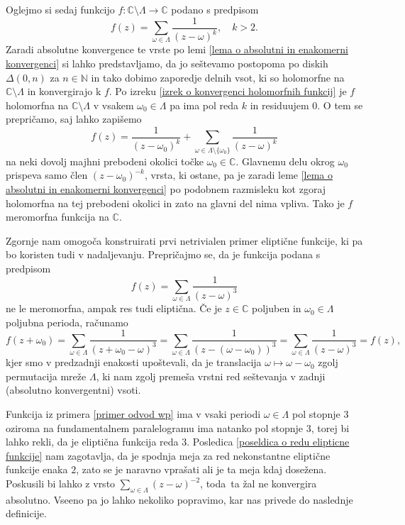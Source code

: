 \documentclass[mat1]{fmfdelo}
\newcommand{\N}{\mathbb N}
\newcommand{\C}{\mathbb C}
\newcommand{\om}{\omega}
\newcommand{\disk}[2]{\Delta(#1, #2)}
\theoremstyle{definition}
\begin{document}
\begin{dokaz}
    \cite[\S 5, Theorem 1]{Ahlfors}
\end{dokaz}
    
Oglejmo si sedaj funkcijo $f:\C\setminus\Lambda \to \C$ podano s predpisom
\[
    f(z) = \sum_{\om \in \Lambda} \frac{1}{(z - \om)^k}, \quad k > 2.
\]
Zaradi absolutne konvergence te vrste po lemi \ref{lema o absolutni in enakomerni konvergenci} si lahko predstavljamo, da jo seštevamo postopoma po diskih $\disk{0}{n}$ za $n\in\N$ in tako dobimo zaporedje delnih vsot, ki so holomorfne na $\C\setminus\Lambda$ in konvergirajo k $f$. Po izreku \ref{izrek o konvergenci holomorfnih funkcij} je $f$ holomorfna na $\C \setminus \Lambda$ v vsakem $\om_0 \in \Lambda$ pa ima pol reda $k$ in residuujem $0$. O tem se prepričamo, saj lahko zapišemo
\[
    f(z) = \frac{1}{(z-\om_0)^k} + \sum_{\om \in \Lambda \setminus \{\om_0\}} \frac{1}{(z - \om)^k}
\]
na neki dovolj majhni prebodeni okolici točke $\om_0\in \C$. Glavnemu delu okrog $\om_0$ prispeva samo člen $(z - \om_0)^{-k}$, vrsta, ki ostane, pa je zaradi leme \ref{lema o absolutni in enakomerni konvergenci} po podobnem razmisleku kot zgoraj holomorfna na tej prebodeni okolici in zato na glavni del nima vpliva. Tako je $f$ meromorfna funkcija na $\C$. 

\begin{primer*}
    \label{primer odvod wp}
    Zgornje nam omogoča konstruirati prvi netrivialen primer eliptične funkcije, ki pa bo koristen tudi v nadaljevanju. Prepričajmo se, da je funkcija podana s predpisom
    \[
        f(z) = \sum_{\om \in \Lambda} \frac{1}{(z - \om)^3}
    \]
    ne le meromorfna, ampak res tudi eliptična. Če je $z \in \C$ poljuben in $\om_0 \in \Lambda$ poljubna perioda, računamo
    \[
        f(z + \om_0) = 
        \sum_{\om \in \Lambda} \frac{1}{(z + \om_0 - \om)^3} = 
        \sum_{\om \in \Lambda} \frac{1}{(z - (\om - \om_0))^3} = 
        \sum_{\om \in \Lambda} \frac{1}{(z - \om)^3} = 
        f(z),
    \]
    kjer smo v predzadnji enakosti upoštevali, da je translacija $\om \mapsto \om - \om_0$ zgolj permutacija mreže $\Lambda$, ki nam zgolj premeša vrstni red seštevanja v zadnji (absolutno konvergentni) vsoti. 
\end{primer*}

Funkcija iz primera \ref{primer odvod wp} ima v vsaki periodi $\om\in \Lambda$ pol stopnje $3$ oziroma na fundamentalnem paralelogramu ima natanko pol stopnje $3$, torej bi lahko rekli, da je eliptična funkcija reda $3$. Posledica \ref{poseldica o redu elipticne funkcije} nam zagotavlja, da je spodnja meja za red nekonstantne eliptične funkcije enaka $2$, zato se je naravno vprašati ali je ta meja kdaj dosežena. Poskusili bi lahko z vrsto $\sum_{\om\in\Lambda}(z - \om)^{-2}$, toda ta žal ne konvergira absolutno. Vseeno pa jo lahko nekoliko popravimo, kar nas privede do naslednje definicije. 
\end{document}
